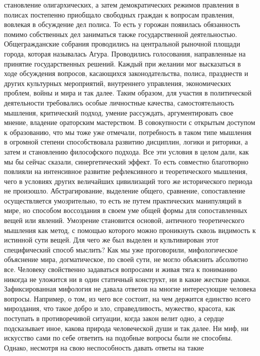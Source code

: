 становление олигархических, а затем демократических режимов правления в полисах
постепенно приобщало свободных граждан к вопросам правления, вовлекая в
обсуждение дел полиса. То есть у горожан появилась обязанность помимо
собственных дел заниматься также государственной деятельностью. Общегражданские
собрания проводились на центральной рыночной площади города, которая называлась
Агура. Проводились голосования, направленные на принятие государственных
решений. Каждый при желании мог высказаться в ходе обсуждения вопросов,
касающихся законодательства, полиса, празднеств и других культурных мероприятий,
внутреннего управления, экономических проблем, войны и мира и так далее. Таким
образом, для участия в политической деятельности требовались особые личностные
качества, самостоятельность мышления, критический подход, умение рассуждать,
аргументировать свое мнение, владение ораторским мастерством. В совокупности с
открытым доступом к образованию, что мы тоже уже отмечали, потребность в таком
типе мышления в огромной степени способствовала развитию дисциплин, логики и
риторики, а затем и становлению философского подхода. Все эти условия в целом
дали, как мы бы сейчас сказали, синергетический эффект. То есть совместно
благотворно повлияли на интенсивное развитие рефлексивного и теоретического
мышления, чего в условиях других величайших цивилизаций того же исторического
периода не произошло. Абстрагирование, выделение общего, сравнение,
сопоставление осуществляется умозрительно, то есть не путем практических
манипуляций в мире, но способом воссоздания в своем уме общей формы для
сопоставленных вещей или явлений. Умозрение становится основой, античного
теоретического мышления как метод, с помощью которого можно проникнуть сквозь
видимость к истинной сути вещей. Для чего же был выделен и культивирован этот
специфический способ мыслить? Как мы уже проговорили, мифологическое объяснение
мира, догматическое, по своей сути, не могло объяснить абсолютно все. Человеку
свойственно задаваться вопросами и живая тяга к пониманию никогда не уложится ни
в один статичный конструкт, ни в какие жесткие рамки. Зафиксированная мифология
не давала ответов на многие интересующие человека вопросы. Например, о том, из
чего все состоит, на чем держится единство всего мироздания, что такое добро и
зло, справедливость, мужество, красота, как поступать в противоречивой ситуации,
когда закон велит одно, а сердце подсказывает иное, какова природа человеческой
души и так далее. Ни миф, ни искусство сами по себе ответить на подобные вопросы
были не способны. Однако, несмотря на свою неспособность давать ответы на такие
